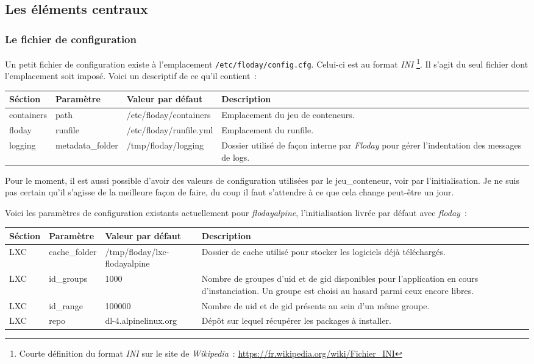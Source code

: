 \subsection{Les éléments centraux}

\subsubsection{Le fichier de configuration}
Un petit fichier de configuration existe à l'emplacement {\tt/etc/floday/config.cfg}.
Celui-ci est au format \emph{INI}%
\footnote{Courte définition du format \emph{INI} sur le site de \emph{Wikipedia}~:
	\url{https://fr.wikipedia.org/wiki/Fichier_INI}
}.
Il s'agit du seul fichier dont l'emplacement soit imposé.
Voici un descriptif de ce qu'il contient~:
\newline

\begin{tabular}{|l|l|p{4cm}|p{4.1cm}|}
	\hline
	Séction & Paramètre & Valeur par défaut & Description \\
	\hline
	containers & path & /etc/floday/containers & Emplacement du jeu de conteneurs.\\
	floday & runfile & /etc/floday/runfile.yml & Emplacement du \gls{runfile}. \\
	logging & metadata\_folder & /tmp/floday/logging & Dossier utilisé de façon interne par \emph{Floday} pour gérer l'indentation des messages de logs. \\
	\hline
\end{tabular}
\newline

Pour le moment, il est aussi possible d'avoir des valeurs de configuration utilisées par le \gls{jeu_conteneur}, voir par l'\gls{initialisation}.
Je ne suis pas certain qu'il s'agisse de la meilleure façon de faire, du coup il faut s'attendre à ce que cela change peut-être un jour.

Voici les paramètres de configuration existants actuellement pour  \emph{flodayalpine}, l'initialisation livrée par défaut avec \emph{floday}~:
\newline

\begin{tabular}{|l|l|p{4cm}|p{5.25cm}|}
	\hline
	Séction & Paramètre & Valeur par défaut & Description \\
	\hline
	LXC & cache\_folder & /tmp/floday/lxc-flodayalpine & Dossier de cache utilisé pour stocker les logiciels déjà téléchargés.\\
	LXC & id\_groups & 1000 & Nombre de groupes d'uid et de gid disponibles pour l'\gls{application} en cours d'\gls{instanciation}. Un groupe est choisi au hasard parmi ceux encore libres.\\
	LXC & id\_range & 100000 & Nombre de uid et de gid présents au sein d'un même groupe.\\
	LXC & repo & dl-4.alpinelinux.org & Dépôt sur lequel récupérer les packages à installer.\\
	\hline
\end{tabular}
\newline

